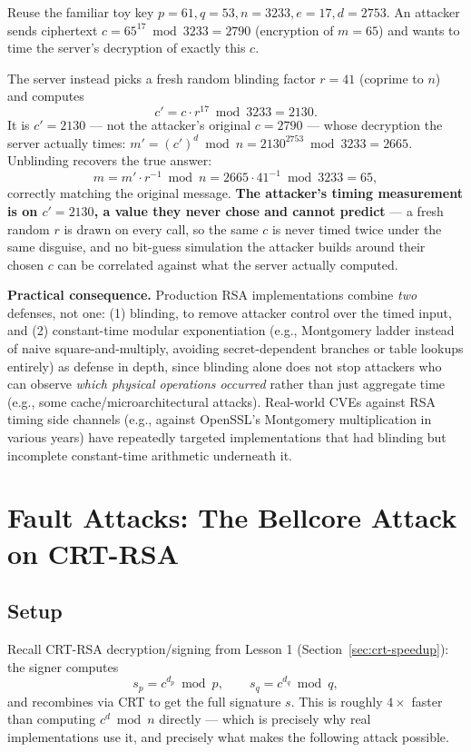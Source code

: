 \begin{example}
Reuse the familiar toy key $p=61,q=53,n=3233,e=17,d=2753$. An attacker sends ciphertext $c = 65^{17} \bmod 3233 = 2790$ (encryption of $m=65$) and wants to time the server's decryption of exactly this $c$.

The server instead picks a fresh random blinding factor $r=41$ (coprime to $n$) and computes
\[
c' = c \cdot r^{17} \bmod 3233 = 2130.
\]
It is $c'=2130$ — not the attacker's original $c=2790$ — whose decryption the server actually times: $m' = (c')^{d} \bmod n = 2130^{2753} \bmod 3233 = 2665$. Unblinding recovers the true answer:
\[
m = m' \cdot r^{-1} \bmod n = 2665 \cdot 41^{-1} \bmod 3233 = 65,
\]
correctly matching the original message. \textbf{The attacker's timing measurement is on $c'=2130$, a value they never chose and cannot predict} — a fresh random $r$ is drawn on every call, so the same $c$ is never timed twice under the same disguise, and no bit-guess simulation the attacker builds around their chosen $c$ can be correlated against what the server actually computed.
\end{example}

\medskip\noindent\textbf{Practical consequence.} Production RSA implementations combine \emph{two} defenses, not one: (1) blinding, to remove attacker control over the timed input, and (2) constant-time modular exponentiation (e.g., Montgomery ladder instead of naive square-and-multiply, avoiding secret-dependent branches or table lookups entirely) as defense in depth, since blinding alone does not stop attackers who can observe \emph{which physical operations occurred} rather than just aggregate time (e.g., some cache/microarchitectural attacks). Real-world CVEs against RSA timing side channels (e.g., against OpenSSL's Montgomery multiplication in various years) have repeatedly targeted implementations that had blinding but incomplete constant-time arithmetic underneath it.

\newpage
\section{Fault Attacks: The Bellcore Attack on CRT-RSA}

\subsection{Setup}

Recall CRT-RSA decryption/signing from Lesson 1 (Section~\ref{sec:crt-speedup}): the signer computes
\[
s_p = c^{d_p} \bmod p, \qquad s_q = c^{d_q} \bmod q,
\]
and recombines via CRT to get the full signature $s$. This is roughly $4\times$ faster than computing $c^d \bmod n$ directly — which is precisely why real implementations use it, and precisely what makes the following attack possible.

